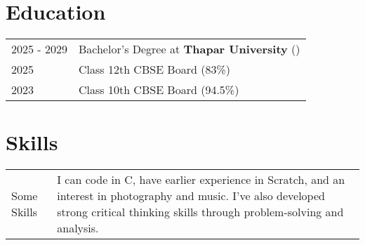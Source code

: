 \documentclass[a4paper,12pt]{article}
\begin{document}
\section{Education}
\begin{tabularx}{\linewidth}{@{}l X@{}}	
2025 - 2029 & Bachelor's Degree at \textbf{Thapar University} \hfill () \\ 
2025 & Class 12th CBSE Board \hfill  (83\%) \\ 
2023 & Class 10th CBSE Board \hfill  (94.5\%) \\
\end{tabularx}

\section{Skills}
\begin{tabularx}{\linewidth}{@{}l X@{}}
Some Skills &  \normalsize{I can code in C, have earlier experience in Scratch, and an interest in photography and music. I’ve also developed strong critical thinking skills through problem-solving and analysis. }\\
\end{tabularx}

\vfill
{}
\end{document}
